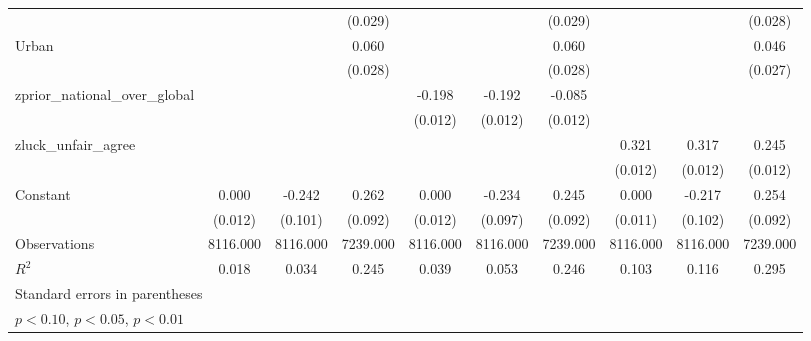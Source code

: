 {\begin{tabular}{l*{9}{c}}
                    &                     &                     &     (0.029)         &                     &                     &     (0.029)         &                     &                     &     (0.028)         \\
\addlinespace
Urban               &                     &                     &       0.060\sym{**} &                     &                     &       0.060\sym{**} &                     &                     &       0.046\sym{*}  \\
                    &                     &                     &     (0.028)         &                     &                     &     (0.028)         &                     &                     &     (0.027)         \\
\addlinespace
zprior\_national\_over\_global&                     &                     &                     &      -0.198\sym{***}&      -0.192\sym{***}&      -0.085\sym{***}&                     &                     &                     \\
                    &                     &                     &                     &     (0.012)         &     (0.012)         &     (0.012)         &                     &                     &                     \\
\addlinespace
zluck\_unfair\_agree  &                     &                     &                     &                     &                     &                     &       0.321\sym{***}&       0.317\sym{***}&       0.245\sym{***}\\
                    &                     &                     &                     &                     &                     &                     &     (0.012)         &     (0.012)         &     (0.012)         \\
\addlinespace
Constant            &       0.000         &      -0.242\sym{**} &       0.262\sym{***}&       0.000         &      -0.234\sym{**} &       0.245\sym{***}&       0.000         &      -0.217\sym{**} &       0.254\sym{***}\\
                    &     (0.012)         &     (0.101)         &     (0.092)         &     (0.012)         &     (0.097)         &     (0.092)         &     (0.011)         &     (0.102)         &     (0.092)         \\
\midrule
Observations        &    8116.000         &    8116.000         &    7239.000         &    8116.000         &    8116.000         &    7239.000         &    8116.000         &    8116.000         &    7239.000         \\
\(R^{2}\)           &       0.018         &       0.034         &       0.245         &       0.039         &       0.053         &       0.246         &       0.103         &       0.116         &       0.295         \\
\bottomrule
\multicolumn{10}{l}{\footnotesize Standard errors in parentheses}\\
\multicolumn{10}{l}{\footnotesize \sym{*} \(p<0.10\), \sym{**} \(p<0.05\), \sym{***} \(p<0.01\)}\\
\end{tabular}
}
